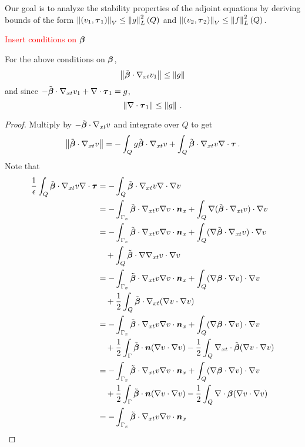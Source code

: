 \documentclass{article}
\begin{document}
Our goal is to analyze the stability properties of the adjoint equations by deriving bounds of the form
$\left\| (v_1,\boldsymbol\tau_1) \right\|_V\leq\left\| g \right\|_L^2\left( Q \right)$ and $\left\| (v_2,\boldsymbol\tau_2) \right\|_V\leq\left\| f \right\|_L^2\left( Q \right)$.

\textcolor{red}{Insert conditions on $\boldsymbol\beta$}
\begin{lemma}
\label{lem:convective}
For the above conditions on $\boldsymbol\beta$,
\[
\left\| \tilde{\boldsymbol\beta}\cdot\nabla_{xt} v_1 \right\|\leq \left\| g \right\|
\]
and since $-\tilde{\boldsymbol\beta}\cdot\nabla_{xt} v_1+\nabla\cdot\boldsymbol\tau_1=g$,
\[
\left\| \nabla\cdot\boldsymbol\tau_1 \right\|\leq\left\| g \right\|\,.
\]
\end{lemma}
\begin{proof}
Multiply by $-\tilde{\boldsymbol\beta}\cdot\nabla_{xt} v$ and integrate over $Q$ to get
\begin{equation}
\label{eq:adj1}
\left\| \tilde{\boldsymbol\beta}\cdot\nabla_{xt} v \right\|=-\int_Q g\tilde{\boldsymbol\beta}\cdot\nabla_{xt} v+\int_Q\tilde{\boldsymbol\beta}\cdot\nabla_{xt} v\nabla\cdot\boldsymbol\tau\,.
\end{equation}
Note that
\begin{align*}
\frac{1}{\epsilon}\int_Q\tilde\bfbeta\cdot\Gradxt v\Div\bftau&=-\int_Q\tilde\bfbeta\cdot\Gradxt v\Div\Grad v \\
%
&=-\int_{\Gamma_x}\tilde\bfbeta\cdot\Gradxt v\Grad v\cdot\bfn_x
+\int_Q\Grad(\tilde\bfbeta\cdot\Gradxt v)\cdot\Grad v \\
%
&=-\int_{\Gamma_x}\tilde\bfbeta\cdot\Gradxt v\Grad v\cdot\bfn_x
+\int_Q(\Grad\tilde\bfbeta\cdot\Gradxt v)\cdot\Grad v\\
&\quad+\int_Q\tilde\bfbeta\cdot\Grad\Gradxt v\cdot\Grad v\\
%
&=-\int_{\Gamma_x}\tilde\bfbeta\cdot\Gradxt v\Grad v\cdot\bfn_x
+\int_Q(\Grad\bfbeta\cdot\Grad v)\cdot\Grad v\\
&\quad+\frac{1}{2}\int_Q\tilde\bfbeta\cdot\Gradxt(\Grad v\cdot\Grad v)\\
%
&=-\int_{\Gamma_x}\tilde\bfbeta\cdot\Gradxt v\Grad v\cdot\bfn_x
+\int_Q(\Grad\bfbeta\cdot\Grad v)\cdot\Grad v\\
&\quad+\frac{1}{2}\int_\Gamma\tilde\bfbeta\cdot\bfn(\Grad v\cdot\Grad v)
-\frac{1}{2}\int_Q\Divxt\tilde\bfbeta(\Grad v\cdot\Grad v)\\
%
&=-\int_{\Gamma_x}\tilde\bfbeta\cdot\Gradxt v\Grad v\cdot\bfn_x
+\int_Q(\Grad\bfbeta\cdot\Grad v)\cdot\Grad v\\
&\quad+\frac{1}{2}\int_\Gamma\tilde\bfbeta\cdot\bfn(\Grad v\cdot\Grad v)
-\frac{1}{2}\int_Q\Div\bfbeta(\Grad v\cdot\Grad v)\\
%
&=-\int_{\Gamma_x}\tilde\bfbeta\cdot\Gradxt v\Grad v\cdot\bfn_x

\end{align*}
\end{proof}
\end{document}
